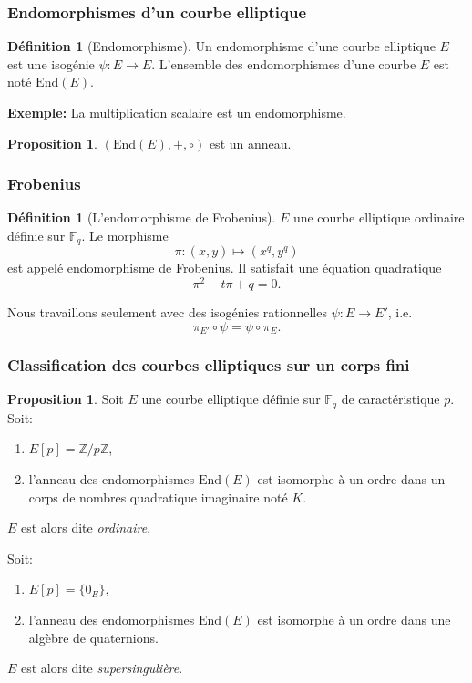 \documentclass[10pt,a4paper]{beamer}
\theoremstyle{plain}
\theoremstyle{definition}
\theoremstyle{definition}
\theoremstyle{definition}
\newtheorem{prop}[thm]{Proposition}
\theoremstyle{definition}
\newtheorem{defi}[thm]{Définition}
\theoremstyle{remark}
\theoremstyle{remark}
\theoremstyle{definition}
\begin{document}
\begin{frame}
\frametitle{Endomorphismes d'un courbe elliptique}
\begin{defi}[Endomorphisme]
Un endomorphisme d'une courbe elliptique $E$ est une isogénie $\psi:E \rightarrow E$. L'ensemble des endomorphismes d'une courbe $E$ est noté $\mathrm{End}(E)$.
\end{defi}

\smallskip

\textbf{Exemple:} La multiplication scalaire est un endomorphisme.

\smallskip

\begin{prop}
$\left( \mathrm{End}(E),+,\circ \right)$ est un anneau.
\end{prop}
\end{frame}

\begin{frame}
\frametitle{Frobenius}
\begin{defi}[L'endomorphisme de Frobenius]
$E$ une courbe elliptique ordinaire définie sur $\mathbb{F}_q$. Le morphisme
\[ \pi:(x,y) \mapsto (x^q,y^q)\] est appelé endomorphisme de Frobenius. Il
satisfait une équation quadratique \[ \pi^2 - t \pi + q = 0.\]
\end{defi}

Nous travaillons seulement avec des isogénies rationnelles $\psi:E \to E'$, i.e.
\[
\pi_{E'} \circ \psi =\psi \circ \pi_{E}.
 \]
 
\end{frame}


\begin{frame}
\frametitle{Classification des courbes elliptiques sur un corps fini}
\begin{prop}
Soit $E$ une courbe elliptique définie sur $\mathbb{F}_q$ de caractéristique 
$p$. Soit:
\begin{enumerate}
\item $E[p]=\mathbb{Z}/p\mathbb{Z}$,
\item l'anneau des endomorphismes $\mathrm{End}(E)$ est isomorphe à un ordre dans un corps de nombres quadratique imaginaire noté $K$.
\end{enumerate}
$E$ est alors dite \emph{ordinaire}.

Soit:
\begin{enumerate}
\item $E[p]=\{0_E\}$,
\item l'anneau des endomorphismes $\mathrm{End}(E)$ est isomorphe à un ordre dans une algèbre de quaternions.
\end{enumerate}
$E$ est alors dite \emph{supersingulière}.

\end{prop}

\end{frame}
\end{document}
